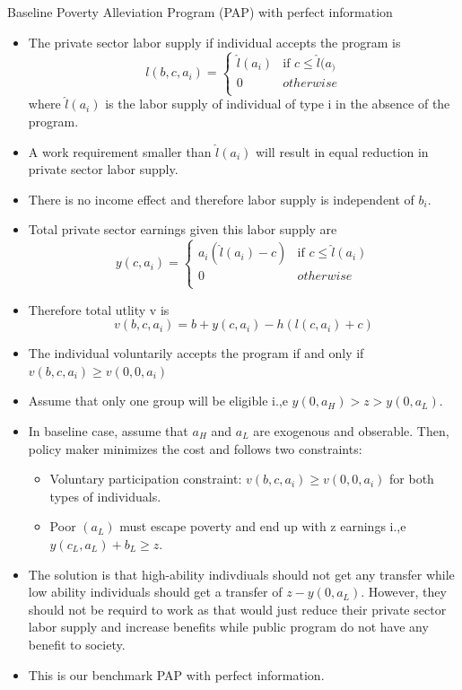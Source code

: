 \documentclass{beamer}
\begin{document}
\begin{frame}[allowframebreaks]{Baseline Poverty Alleviation Program (PAP) with perfect information}
\begin{itemize}
    \item The private sector labor supply if individual accepts the program is 
\[
l(b,c,a_i) = 
\begin{cases}
    \hat{l}(a_i) & \text{if } c \leq \hat{l}(a_) \\
    0 & otherwise \\
\end{cases}
\]
where $\hat{l}(a_i)$ is the labor supply of individual of type i in the absence of the program.
\item A work requirement smaller than $\hat{l}(a_i)$ will result in equal reduction in private sector labor supply. 
\item There is no income effect and therefore labor supply is independent of $b_i$.
\item Total private sector earnings given this labor supply are 
\[y(c,a_i)= \begin{cases}
    a_i ( \hat{l}(a_i) - c) & \text{if } c \leq \hat{l}(a_i) \\     
    0 & otherwise \\
\end{cases} \]
\item Therefore total utlity v is 
\[v(b,c,a_i) = b+y(c,a_i) - h(l(c,a_i)+c)\]
\item The individual voluntarily accepts the program if and only if $v(b,c,a_i) \geq v(0,0,a_i)$
\item Assume that only one group will be eligible i.,e $y(0,a_H)>z>y(0,a_L)$.
\item In baseline case, assume that $a_H$ and $a_L$ are exogenous and obserable. Then, policy maker minimizes the cost and follows two constraints: 
\begin{itemize}
    \item Voluntary participation constraint: $v(b,c,a_i) \geq v(0,0,a_i)$ for both types of individuals.
    \item Poor $(a_L)$ must escape poverty and end up with z earnings i.,e $y(c_L,a_L)+b_L \geq z$.
     \end{itemize}

    \item The solution is that high-ability indivdiuals should not get any transfer while low ability individuals should get a transfer of $z-y(0,a_L)$. However, they should not be requird to work as that would just reduce their private sector labor supply and increase benefits while public program do not have any benefit to society. 
    \item This is our benchmark PAP with perfect information.


\end{itemize}

\end{frame}
\end{document}
